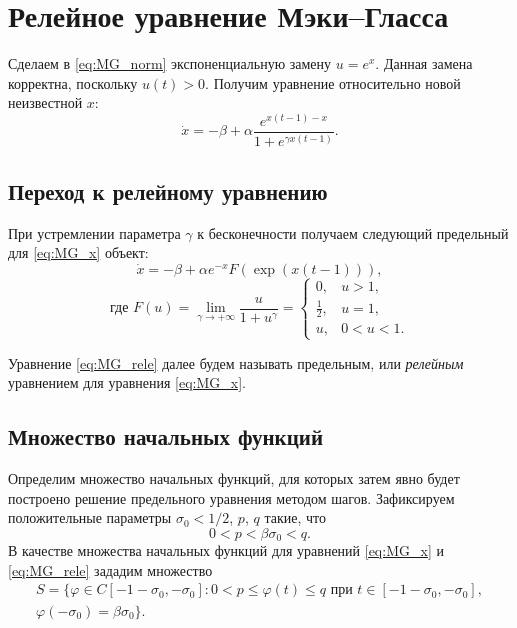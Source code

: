\section{Релейное уравнение Мэки--Гласса}\label{sec:ch1/sec1}

Сделаем в \eqref{eq:MG_norm} экспоненциальную замену $u=e^x$. Данная замена корректна, поскольку $u(t) > 0$. Получим уравнение относительно новой неизвестной $x$:
\begin{equation}
	\label{eq:MG_x}
	\dot{x}=-\beta+\alpha\frac{e^{x(t-1)-x}}{1+e^{\gamma x(t-1)}}.
\end{equation}

\subsection{Переход к релейному уравнению}

При устремлении параметра $\gamma$ к бесконечности получаем следующий предельный для \eqref{eq:MG_x} объект:
\begin{equation}
    \label{eq:MG_rele}
    \dot{x}=-\beta + \alpha e^{-x} F(\exp({x(t-1)})),
\end{equation}
%
\begin{equation*}
    \text{где }
    F(u)=\lim\limits_{\gamma\to +\infty}\frac{u}{1+u^{\gamma}}=
    \begin{cases}
        0, & u > 1,\\
        \frac{1}{2}, & u = 1,\\
        u, & 0 < u < 1.
    \end{cases}
\end{equation*}

Уравнение \eqref{eq:MG_rele} далее будем называть предельным, или \emph{релейным} уравнением для уравнения \eqref{eq:MG_x}.

\subsection{Множество начальных функций}

Определим множество начальных функций, для которых затем явно будет построено решение предельного уравнения методом шагов. Зафиксируем положительные параметры $\sigma_0 < 1/2$, $p$, $q$ такие, что 
%
\[0 < p < \beta \sigma_0 < q.\]
%
В качестве множества начальных функций для уравнений \eqref{eq:MG_x} и \eqref{eq:MG_rele} зададим множество
\begin{multline}
    \label{eq:init_set}
    S=\{\varphi\in C[-1 - \sigma_0, -\sigma_0]: 0 < p \leqslant \varphi(t)\leqslant q \text{ при } t \in [-1 - \sigma_0, -\sigma_0],\\ \varphi(-\sigma_0) = \beta \sigma_0 \}.
\end{multline}

